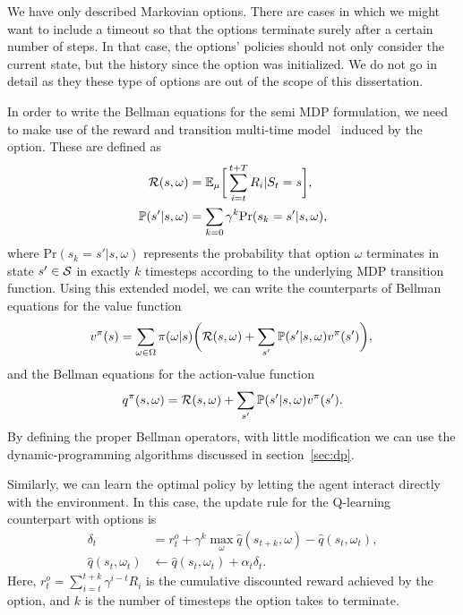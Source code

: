 We have only described Markovian options. There are cases in which we might want to include a timeout so that the options terminate surely after a certain number of steps. In that case, the options' policies should not only consider the current state, but the history since the option was initialized. We do not go in detail as they these type of options are out of the scope of this dissertation.


In order to write the Bellman equations for the semi MDP formulation, we need to make use of the reward and transition multi-time model~\citep{Sutton1999} induced by the option. These are defined as
\begin{align}
  \mathcal{R}(s, \omega) &= \mathbb{E}_\mu\bigg[\sum_{i=t}^{t+T}R_i\lvert S_t=s\bigg],\\
  \mathbb{P}(s'\lvert s, \omega) &= \sum_{k=0} \gamma^k \text{Pr}(s_k = s'\lvert s,\omega),
\end{align}
where $\text{Pr}(s_k = s'\lvert s,\omega)$ represents the probability that option $\omega$ terminates in state $s'\in\mathcal{S}$ in exactly $k$ timesteps according to the underlying MDP transition function. Using this extended model, we can write the counterparts of Bellman equations for the value function
\begin{equation}
  v^\pi(s) = \sum_{\omega\in\Omega}\pi(\omega\lvert s)\bigg(\mathcal{R}(s,\omega) + \sum_{s'}\mathbb{P}(s'\lvert s, \omega)v^\pi(s')\bigg),\\
\end{equation}
and the Bellman equations for the action-value function
\begin{equation}
  q^\pi(s, \omega) = \mathcal{R}(s,\omega) + \sum_{s'}\mathbb{P}(s'\lvert s, \omega)v^\pi(s').\\
\end{equation}
By defining the proper Bellman operators, with little modification we can use the dynamic-programming algorithms discussed in section~\ref{sec:dp}.

Similarly, we can learn the optimal policy by letting the agent interact directly with the environment. In this case, the update rule for the Q-learning counterpart with options is
\begin{align}
  \delta_t &= r^o_t + \gamma^k \max_{\omega} \widehat q(s_{t+k}, \omega) - \widehat q(s_t, \omega_t),\\
  \widehat q(s_t, \omega_t) &\gets \widehat q(s_t, \omega_t) + \alpha_t \delta_t.
\end{align}
Here, $r^o_t = \sum_{i=t}^{t+k}\gamma^{i-t}R_i$ is the cumulative discounted reward achieved by the option, and $k$ is the number of timesteps the option takes to terminate.

